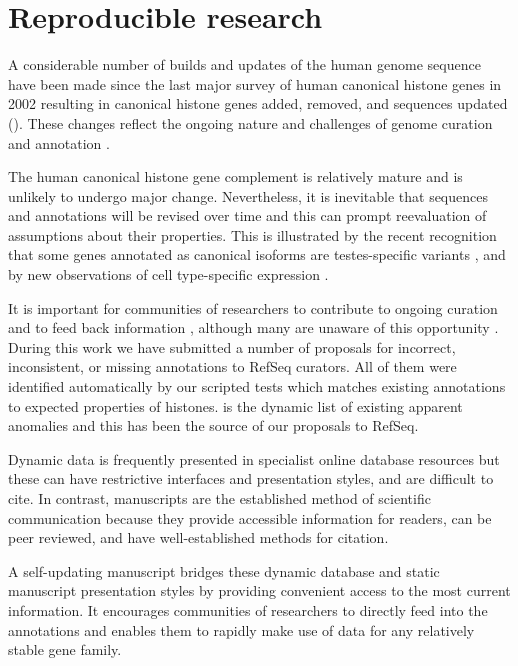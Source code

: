 \section{Reproducible research}
\label{sec:reproducible}

  A considerable number of builds and updates of the human genome sequence have been made
  since the last major survey of human canonical histone genes in 2002 \citep{Marzluff02}
  resulting in
  \AddedSinceReference{} canonical histone genes added,
  \RemovedSinceReference{} removed,
  and \SequencesUpdatedSinceReference{}
  sequences updated ().
  These changes reflect the ongoing nature and challenges of
  genome curation and annotation \citep{BorkKoonin1998}.

  The human canonical histone gene complement is relatively mature
  and is unlikely to undergo major change.
  Nevertheless, it is inevitable that sequences and annotations will be revised over time
  and this can prompt reevaluation of assumptions about their properties.
  This is illustrated by the recent recognition that
  some genes annotated as canonical isoforms are testes-specific variants \citep{Talbert2012},
  and by new observations of cell type-specific expression \citep{Molden2015}.

  It is important for communities of researchers to contribute
  to ongoing curation and to feed back information \citep{SteinNRG2001},
  although many are unaware of this opportunity \citep{HollidaySPR2015}.
  During this work we have submitted a number
  of proposals for incorrect, inconsistent, or missing annotations
  to RefSeq curators.  All of them were identified automatically
  by our scripted tests which matches existing
  annotations to expected properties of histones.
   is the dynamic list of existing apparent
  anomalies and this has been the source of our proposals to RefSeq.

  Dynamic data is frequently presented in specialist online database resources
  but these can have restrictive interfaces and presentation styles, and are difficult to cite.
  In contrast, manuscripts are the established method of scientific communication
  because they provide accessible information for readers, can be peer reviewed, 
  and have well-established methods for citation.

  A self-updating manuscript bridges these dynamic database and static manuscript
  presentation styles by providing convenient access to the most current information.
  It encourages communities of researchers to directly feed into the annotations
  and enables them to rapidly make use of data for any relatively stable gene family.

